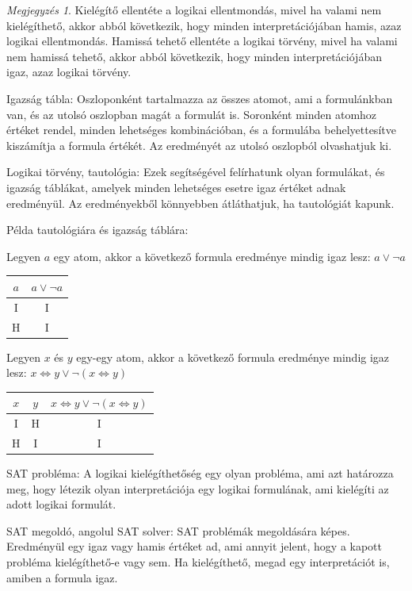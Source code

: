 \documentclass[
]{thesis-ekf}
\theoremstyle{definition}
\theoremstyle{remark}
\newtheorem{megjegyzes}[tetel]{Megjegyzés}
\begin{document}
\begin{megjegyzes}
	Kielégítő ellentéte a logikai ellentmondás, mivel ha valami nem kielégíthető, akkor abból következik, hogy minden interpretációjában hamis, azaz logikai ellentmondás. Hamissá tehető ellentéte a logikai törvény, mivel ha valami nem hamissá tehető, akkor abból következik, hogy minden interpretációjában igaz, azaz logikai törvény.
\end{megjegyzes}

	Igazság tábla: Oszloponként tartalmazza az összes atomot, ami a formulánkban van, és az utolsó oszlopban magát a formulát is. Soronként minden atomhoz értéket rendel, minden lehetséges kombinációban, és a formulába behelyettesítve kiszámítja a formula értékét. Az eredményét az utolsó oszlopból olvashatjuk ki.

	Logikai törvény, tautológia: Ezek segítségével felírhatunk olyan formulákat, és igazság táblákat, amelyek minden lehetséges esetre igaz értéket adnak eredményül. Az eredményekből könnyebben átláthatjuk, ha tautológiát kapunk.

	Példa tautológiára és igazság táblára: 
		
	Legyen $ a $ egy atom, akkor a következő formula eredménye mindig igaz lesz: $ a\vee\neg a $
	
	\begin{tabular}{|c|c|}
		\hline
		$ a $ & $ a\vee\neg a $ \\
		\hline
		I & I \\
		\hline
		H & I \\
		\hline
	\end{tabular}

	Legyen $ x $ és $ y $ egy-egy atom, akkor a következő formula eredménye mindig igaz lesz: $ x \Leftrightarrow y\vee \neg(x\Leftrightarrow y) $
	
	\begin{tabular}{|c|c|c|}
		\hline
		$ x $ & $ y $ & $ x\Leftrightarrow y\vee\neg(x\Leftrightarrow y) $ \\
		\hline
		I & H & I \\
		\hline
		H & I & I \\
		\hline
	\end{tabular}

	\textsc{SAT} probléma: A logikai kielégíthetőség egy olyan probléma, ami azt határozza meg, hogy létezik olyan interpretációja egy logikai formulának, ami kielégíti az adott logikai formulát.

	\textsc{SAT} megoldó, angolul \textsc{SAT} solver: \textsc{SAT} problémák megoldására képes. Eredményül egy igaz vagy hamis értéket ad, ami annyit jelent, hogy a kapott probléma kielégíthető-e vagy sem. Ha kielégíthető, megad egy interpretációt is, amiben a formula igaz.
\end{document}
